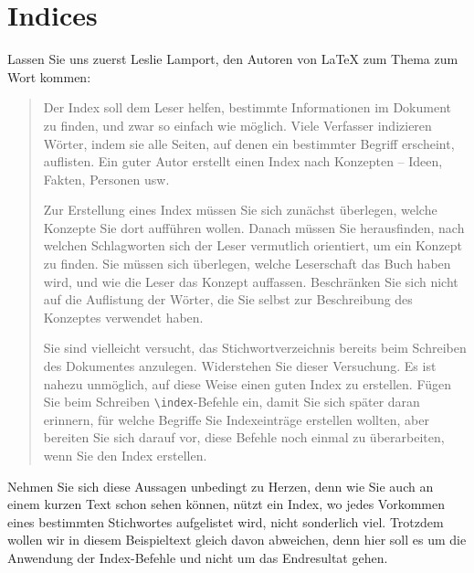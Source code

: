 \documentclass[11pt, a4paper,draft]{article}
\newcommand{\ltx}{\LaTeX}
\begin{document}
\section{Indices}
Lassen Sie uns zuerst Leslie Lamport, den Autoren von \ltx{} zum Thema zum Wort kommen:
\begin{quote}
Der Index soll dem Leser helfen, bestimmte Informationen im Dokument zu finden, und zwar so einfach wie möglich. Viele Verfasser indizieren Wörter, indem sie alle Seiten, auf denen ein bestimmter Begriff erscheint, auflisten. Ein guter Autor erstellt einen Index nach Konzepten -- Ideen, Fakten, Personen usw.

Zur Erstellung eines Index müssen Sie sich zunächst überlegen, welche Konzepte Sie dort aufführen wollen. Danach müssen Sie herausfinden, nach welchen Schlagworten sich der Leser vermutlich orientiert, um ein Konzept zu finden. Sie müssen sich überlegen, welche Leserschaft das Buch haben wird, und wie die Leser das Konzept auffassen. Beschränken Sie sich nicht auf die Auflistung der Wörter, die Sie selbst zur Beschreibung des Konzeptes verwendet haben.

Sie sind vielleicht versucht, das Stichwortverzeichnis bereits beim Schreiben des Dokumentes anzulegen. Widerstehen Sie dieser Versuchung. Es ist nahezu unmöglich, auf diese Weise einen guten Index zu erstellen. Fügen Sie beim Schreiben \verb+\index+-Befehle ein, damit Sie sich später daran erinnern, für welche Begriffe Sie Indexeinträge erstellen wollten, aber bereiten Sie sich darauf vor, diese Befehle noch einmal zu überarbeiten, wenn Sie den Index erstellen.
\end{quote}
Nehmen Sie sich diese Aussagen unbedingt zu Herzen\cite{dlb}, denn wie Sie auch an einem kurzen Text schon sehen können, nützt ein Index, wo jedes Vorkommen eines bestimmten Stichwortes aufgelistet wird, nicht sonderlich viel. Trotzdem wollen wir in diesem Beispieltext gleich davon abweichen, denn hier soll es um die Anwendung der Index-Befehle und nicht um das Endresultat gehen.
\end{document}
